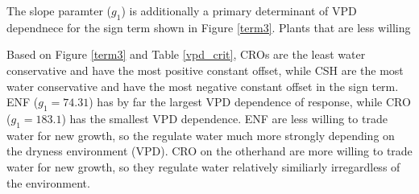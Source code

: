 \documentclass[draft,linenumbers]{agujournal}
\begin{document}
The slope paramter ($g_1$) is additionally a primary determinant of VPD  dependnece for the sign term shown in Figure \ref{term3}. Plants that are less willing 

Based on Figure \ref{term3} and Table \ref{vpd_crit}, CROs are the least water conservative and have the most positive constant offset, while CSH are the most water conservative and have the most negative constant offset in the sign term.  ENF ($g_1 = 74.31$) has by far the largest VPD dependence of response, while CRO ($g_1 = 183.1$) has the smallest VPD dependence. ENF are less willing to trade water for new growth, so the regulate water much more strongly depending on the dryness environment (VPD). CRO on the otherhand are more willing to trade water for new growth, so they regulate water relatively similiarly irregardless of the environment.
 
\end{document}
